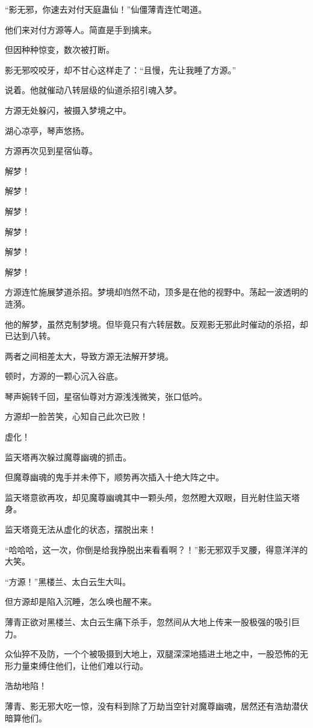 \begin{this_body}
“影无邪，你速去对付天庭蛊仙！”仙僵薄青连忙喝道。

他们来对付方源等人。简直是手到擒来。

但因种种惊变，数次被打断。

影无邪咬咬牙，却不甘心这样走了：“且慢，先让我睡了方源。”

说着。他就催动八转层级的仙道杀招引魂入梦。

方源无处躲闪，被摄入梦境之中。

湖心凉亭，琴声悠扬。

方源再次见到星宿仙尊。

解梦！

解梦！

解梦！

解梦！

解梦！

解梦！

方源连忙施展梦道杀招。梦境却岿然不动，顶多是在他的视野中。荡起一波透明的涟漪。

他的解梦，虽然克制梦境。但毕竟只有六转层数。反观影无邪此时催动的杀招，却已达到八转。

两者之间相差太大，导致方源无法解开梦境。

顿时，方源的一颗心沉入谷底。

琴声婉转千回，星宿仙尊对方源浅浅微笑，张口低吟。

方源却一脸苦笑，心知自己此次已败！

虚化！

监天塔再次躲过魔尊幽魂的抓击。

但魔尊幽魂的鬼手并未停下，顺势再次插入十绝大阵之中。

监天塔意欲再攻，却见魔尊幽魂其中一颗头颅，忽然瞪大双眼，目光射住监天塔身。

监天塔竟无法从虚化的状态，摆脱出来！

“哈哈哈，这一次，你倒是给我挣脱出来看看啊？！”影无邪双手叉腰，得意洋洋的大笑。

“方源！”黑楼兰、太白云生大叫。

但方源却是陷入沉睡，怎么唤也醒不来。

薄青正欲对黑楼兰、太白云生痛下杀手，忽然间从大地上传来一股极强的吸引巨力。

众仙猝不及防，一个个被吸摄到大地上，双腿深深地插进土地之中，一股恐怖的无形力量束缚住他们，让他们难以行动。

浩劫地陷！

薄青、影无邪大吃一惊，没有料到除了万劫当空针对魔尊幽魂，居然还有浩劫潜伏暗算他们。


\end{this_body}
